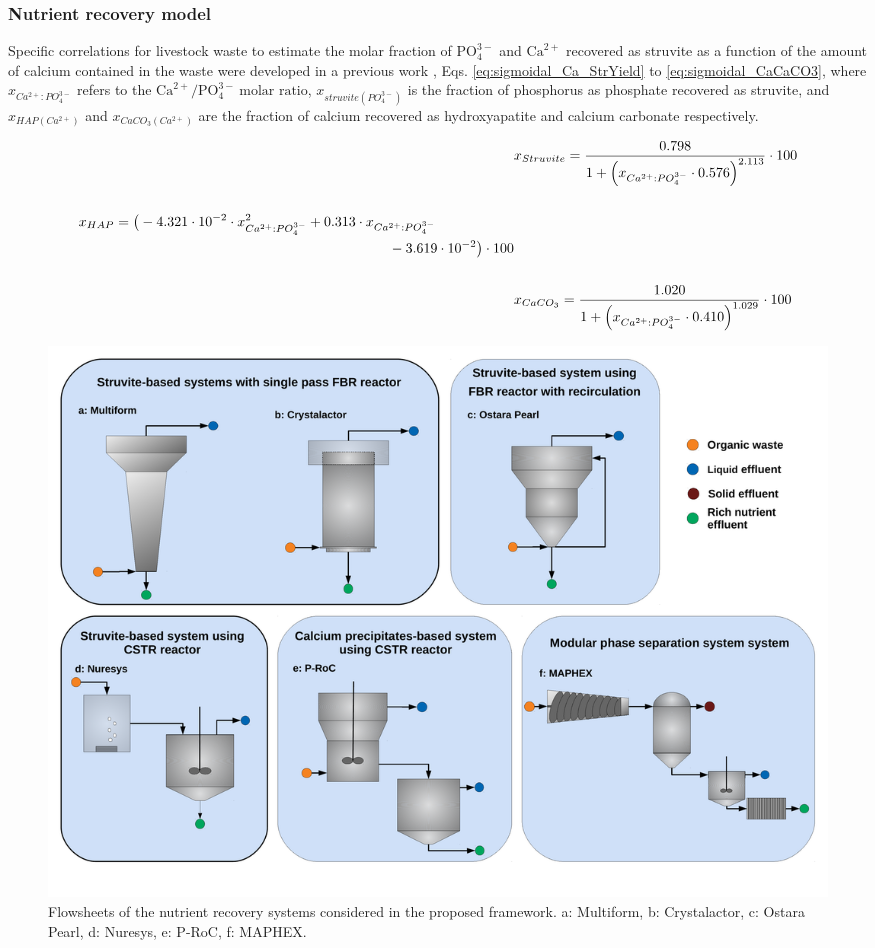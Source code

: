 \begin{refsection}[referencesCh4]
\subsubsection{Nutrient recovery model}
Specific correlations for livestock waste to estimate the molar fraction of $\text{PO}_{4}^{3-}$ and $\text{Ca}^{2+}$ recovered as struvite as a function of the amount of calcium contained in the waste were developed in a previous work \citep{MartinStruvite}, Eqs. \ref{eq:sigmoidal_Ca_StrYield} to \ref{eq:sigmoidal_CaCaCO3}, where $x_{Ca^{2+}:PO_{4}^{3-}}$ refers to the $\text{Ca}^{2+}/\text{PO}_{4}^{3-} \ \text{molar ratio}$, $x_{struvite \left(PO_{4}^{3-}\right) }$ is the fraction of phosphorus as phosphate recovered as struvite, and $x_{HAP \left(Ca^{2+}\right)}$ and $x_{CaCO_{3} \left(Ca^{2+}\right)}$ are the fraction of calcium recovered as hydroxyapatite and calcium carbonate respectively.

\begin{align}
&x_{Struvite}= \frac{0.798}{1+\left(x_{Ca^{2+}:PO_{4}^{3-}} \cdot 0.576\right)^{2.113}} \cdot 100 \label{eq:sigmoidal_Ca_StrYield} \\
\nonumber \\
\begin{split}
& x_{HAP} =\big(-4.321 \cdot 10^{-2} \cdot x_{Ca^{2+}:PO_{4}^{3-}}^{2} + 0.313 \cdot x_{Ca^{2+}:PO_{4}^{3-}} \\& \hspace{7.8cm} - 3.619 \cdot 10^{-2} \big) \cdot 100 \label{eq:sigmoidal_Ca_HAP}
\end{split}
\\
\nonumber \\
&  x_{CaCO_{3}} = \frac{1.020}{1+\left(x_{Ca^{2+}:PO_{4}^{3-}} \cdot 0.410 \right)^{1.029}} \cdot 100 \label{eq:sigmoidal_CaCaCO3}
\end{align}

\begin{figure}[h]
	\centering
	\includegraphics[width=1\linewidth, trim={0cm 2.5cm 0cm 0cm},clip]{gfx/AppendixC/diagrams} 
	\caption{Flowsheets of the nutrient recovery systems considered in the proposed framework. a: Multiform, b: Crystalactor, c: Ostara Pearl, d: Nuresys, e: P-RoC, f: MAPHEX.}
	\label{fig:techs_diagrams}
\end{figure}


\end{refsection}
